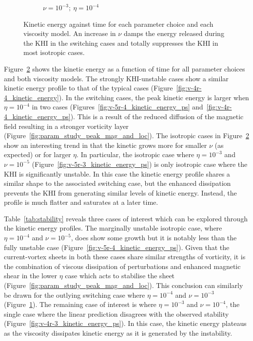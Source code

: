 \begin{figure}[t]
\begin{subfigure}{0.32\textwidth}
      \caption{$\nu = 10^{-3};\ \eta = 10^{-4}$}%
      \label{fig:v-3r-4_kinetic_energy_ps}
    \end{subfigure}
  \caption{Kinetic energy against time for each parameter choice and each viscosity model. An increase in $\nu$ damps the energy released during the KHI in the switching cases and totally suppresses the KHI in most isotropic cases.}%
  \label{fig:param_study_kinetic_energies}
\end{figure}

Figure~\ref{fig:param_study_kinetic_energies} shows the kinetic energy as a function of time for all parameter choices and both viscosity models. The strongly KHI-unstable cases show a similar kinetic energy profile to that of the typical cases (Figure~\ref{fig:v-4r-4_kinetic_energy}). In the switching cases, the peak kinetic energy is larger when $\eta=10^{-4}$ in two cases (Figures~\ref{fig:v-5r-4_kinetic_energy_ps} and~\ref{fig:v-4r-4_kinetic_energy_ps}). This is a result of the reduced diffusion of the magnetic field resulting in a stronger vorticity layer (Figure~\ref{fig:param_study_peak_mag_and_loc}). The isotropic cases in Figure~\ref{fig:param_study_kinetic_energies} show an interesting trend in that the kinetic grows more for smaller $\nu$ (as expected) or for larger $\eta$. In particular, the isotropic case where $\eta=10^{-3}$ and $\nu=10^{-5}$ (Figure~\ref{fig:v-5r-3_kinetic_energy_ps}) is only isotropic case where the KHI is significantly unstable. In this case the kinetic energy profile shares a similar shape to the associated switching case, but the enhanced dissipation prevents the KHI from generating similar levels of kinetic energy. Instead, the profile is much flatter and saturates at a later time.

Table~\ref{tab:stability} reveals three cases of interest which can be explored through the kinetic energy profiles. The marginally unstable isotropic case, where $\eta=10^{-4}$ and $\nu=10^{-5}$, does show some growth but it is notably less than the fully unstable case (Figure~\ref{fig:v-5r-4_kinetic_energy_ps}). Given that the current-vortex sheets in both these cases share similar strengths of vorticity, it is the combination of viscous dissipation of perturbations and enhanced magnetic shear in the lower $\eta$ case which acts to stabilise the sheet (Figure~\ref{fig:param_study_peak_mag_and_loc}). This conclusion can similarly be drawn for the outlying switching case where $\eta=10^{-4}$ and $\nu=10^{-3}$ (Figure~\ref{fig:v-3r-4_kinetic_energy_ps}). The remaining case of interest is where $\eta=10^{-3}$ and $\nu=10^{-4}$, the single case where the linear prediction disagrees with the observed stability (Figure~\ref{fig:v-4r-3_kinetic_energy_ps}). In this case, the kinetic energy plateaus as the viscosity dissipates kinetic energy as it is generated by the instability.

